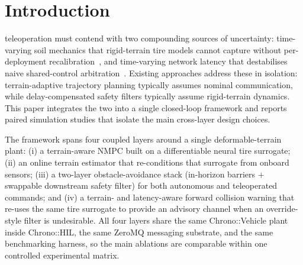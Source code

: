 \documentclass[conference,letterpaper,10pt]{IEEEtran}
\begin{document}
\section{Introduction}
\label{sec:intro}

 teleoperation must contend with two
compounding sources of uncertainty: time-varying soil mechanics that
rigid-terrain tire models cannot capture without per-deployment
recalibration~\cite{Dallas21,Bekker69}, and time-varying network
latency that destabilises naive shared-control
arbitration~\cite{Choi23,Zhang25}. Existing approaches address these
in isolation: terrain-adaptive trajectory planning typically assumes
nominal communication, while delay-compensated safety filters
typically assume rigid-terrain dynamics. This paper integrates the two
into a single closed-loop framework and reports paired simulation
studies that isolate the main cross-layer design choices.

The framework spans four coupled layers around a single deformable-terrain
plant: (i) a terrain-aware NMPC built on a differentiable neural tire
surrogate; (ii) an online terrain estimator that re-conditions that
surrogate from onboard sensors; (iii) a two-layer obstacle-avoidance
stack (in-horizon barriers $+$ swappable downstream safety filter) for
both autonomous and teleoperated commands; and (iv) a terrain- and
latency-aware forward collision warning that re-uses the same tire
surrogate to provide an advisory channel when an override-style filter
is undesirable. All four layers share the same Chrono::Vehicle plant
inside Chrono::HIL, the same ZeroMQ messaging substrate, and the same
benchmarking harness, so the main ablations are comparable within one
controlled experimental matrix.
\end{document}
